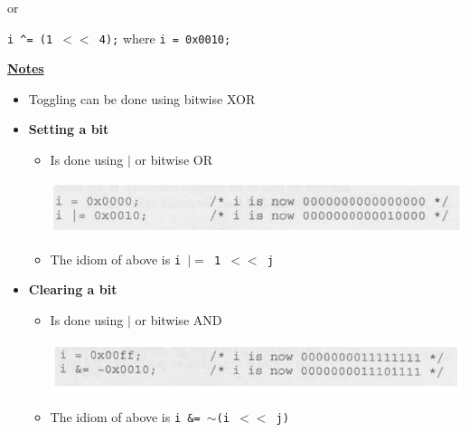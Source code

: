 \documentclass[12pt]{article}
\begin{document}
\begin{enumerate}[1.]
\begin{mdframed}
\begin{itemize}
        \bigskip

        or

        \bigskip

        \texttt{i \^{}= (1 $<<$ 4);} where \texttt{i = 0x0010;}
    \end{itemize}

    \end{mdframed}

    \bigskip

    \underline{\textbf{Notes}}

    \begin{itemize}
        \item Toggling can be done using bitwise XOR


        \item \textbf{Setting a bit}

        \begin{itemize}
            \item Is done using $\vert$ or bitwise OR

            \begin{center}
            \includegraphics[width=\linewidth]{images/review_9_solution_3.png}
            \end{center}

            \item The idiom of above is \texttt{i $\lvert=$ 1 $<<$ j}
        \end{itemize}

        \item \textbf{Clearing a bit}

        \begin{itemize}
            \item Is done using $\vert$ or bitwise AND

            \begin{center}
            \includegraphics[width=\linewidth]{images/review_9_solution_5.png}
            \end{center}

            \item The idiom of above is \texttt{i \&= $\sim$(i $<<$ j)}
        \end{itemize}
    \end{itemize}



\end{enumerate}
\end{document}
